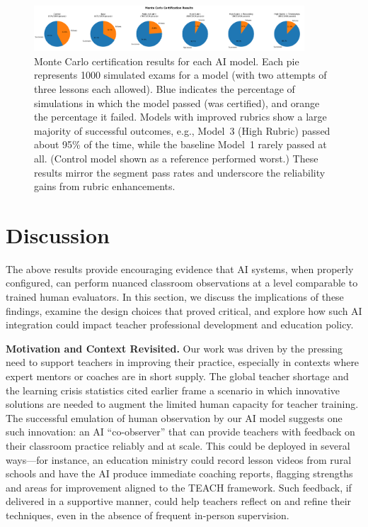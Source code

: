 \documentclass[12pt]{article}
\begin{document}
\begin{figure}[H]\centering
\includegraphics[width=0.9\textwidth]{monte_carlo_pie_charts.png}
\caption{Monte Carlo certification results for each AI model. Each pie represents 1000 simulated exams for a model (with two attempts of three lessons each allowed). Blue indicates the percentage of simulations in which the model passed (was certified), and orange the percentage it failed. Models with improved rubrics show a large majority of successful outcomes, e.g., Model~3 (High Rubric) passed about 95\% of the time, while the baseline Model~1 rarely passed at all. (Control model shown as a reference performed worst.) These results mirror the segment pass rates and underscore the reliability gains from rubric enhancements.}
\label{fig:monte-carlo-pie}
\end{figure}

\section{Discussion}
\label{sec:discussion}
\noindent The above results provide encouraging evidence that AI systems, when properly configured, can perform nuanced classroom observations at a level comparable to trained human evaluators. In this section, we discuss the implications of these findings, examine the design choices that proved critical, and explore how such AI integration could impact teacher professional development and education policy.

\textbf{Motivation and Context Revisited.} Our work was driven by the pressing need to support teachers in improving their practice, especially in contexts where expert mentors or coaches are in short supply. The global teacher shortage and the learning crisis statistics cited earlier frame a scenario in which innovative solutions are needed to augment the limited human capacity for teacher training. The successful emulation of human observation by our AI model suggests one such innovation: an AI “co-observer” that can provide teachers with feedback on their classroom practice reliably and at scale. This could be deployed in several ways—for instance, an education ministry could record lesson videos from rural schools and have the AI produce immediate coaching reports, flagging strengths and areas for improvement aligned to the TEACH framework. Such feedback, if delivered in a supportive manner, could help teachers reflect on and refine their techniques, even in the absence of frequent in-person supervision.
\end{document}
